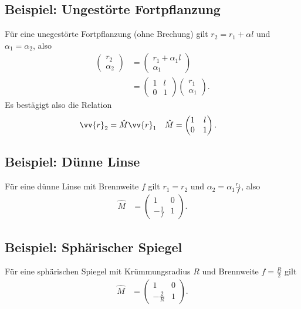 \documentclass[a4paper,12pt]{article}
\numberwithin{equation}{section}
\begin{document}
\subsection{Beispiel: Ungestörte Fortpflanzung}
Für eine unegestörte Fortpflanzung (ohne Brechung) gilt $r_2=r_1+\alpha l$ und $\alpha _1=\alpha _2$, also
\begin{align} 
        \begin{pmatrix}
                r_2\\\alpha _2
        \end{pmatrix}&=\begin{pmatrix}
                r_1+\alpha _1l\\\alpha _1
        \end{pmatrix}\\
        &=\begin{pmatrix}
                1&l\\0&1
        \end{pmatrix}\begin{pmatrix}
                r_1\\\alpha _1
        \end{pmatrix}
.\end{align} 
Es bestägigt also die Relation 
\begin{align} 
        \vv{r}_2&=\hat{M}\vv{r}_1&\hat{M}&=\begin{pmatrix}
                1&l\\0&1
        \end{pmatrix}
.\end{align} 

\subsection{Beispiel: Dünne Linse}
Für eine dünne Linse mit Brennweite $f$ gilt $r_1=r_2$ und $\alpha _2=\alpha _1\tfrac{r_1}{f}$, also
\begin{align} 
        \hat{M}&=\begin{pmatrix}
                1&0\\-\tfrac{1}{f}&1
        \end{pmatrix}
.\end{align} 

\subsection{Beispiel: Sphärischer Spiegel}
Für eine sphärischen Spiegel mit Krümmungsradius $R$ und Brennweite $f=\tfrac{R}{2}$ gilt
\begin{align} 
        \hat{M}&=\begin{pmatrix}
                1&0\\-\tfrac{2}{R}&1
        \end{pmatrix}
.\end{align} 
\end{document}
